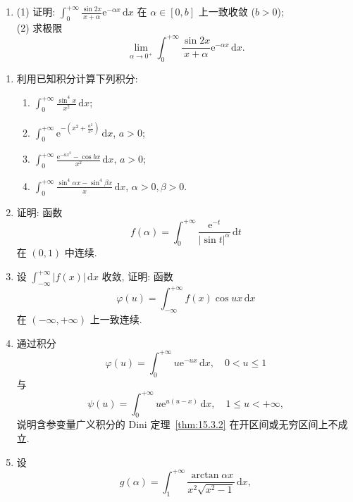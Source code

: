 \begin{exblock}[练习题 15.3]
\begin{enumerate}
\begin{enumerate}
    \item 在任何有限区间 $[0,A]$ 上 ($A>0$), 函数列 $\{f_{n}(x)\}$ 一致收敛于 $f(x)$.
  \end{enumerate}
  证明:
  \[
    \lim_{n\to+\infty}\int_{0}^{+\infty}f_{n}(x)\,\mathrm{d}x=\int_{0}^{+\infty}f(x)\,\mathrm{d}x.
\]
  \item (1) 证明: $\displaystyle\int_{0}^{+\infty}\frac{\sin2x}{x+\alpha}\mathrm{e}^{-\alpha x}\,\mathrm{d}x$ 在 $\alpha\in[0,b]$ 上一致收敛 ($b>0$);\\
  (2) 求极限
  \[
    \lim_{\alpha\to0^{+}}\int_{0}^{+\infty}\frac{\sin2x}{x+\alpha}\mathrm{e}^{-\alpha x}\,\mathrm{d}x.
\]
\end{enumerate}
\end{exblock}

\begin{exblock}[思考题 15.3]
\begin{enumerate}
  \item 利用已知积分计算下列积分:
  \begin{enumerate}
    \item $\displaystyle\int_{0}^{+\infty}\frac{\sin^{4}x}{x^{2}}\,\mathrm{d}x$;
    \item $\displaystyle\int_{0}^{+\infty}\mathrm{e}^{-\left(x^{2}+\frac{a^{2}}{x^{2}}\right)}\,\mathrm{d}x$, $a>0$;
    \item $\displaystyle\int_{0}^{+\infty}\frac{\mathrm{e}^{-ax^{2}}-\cos bx}{x^{2}}\,\mathrm{d}x$, $a>0$;
    \item $\displaystyle\int_{0}^{+\infty}\frac{\sin^{4}\alpha x-\sin^{4}\beta x}{x}\,\mathrm{d}x$, $\alpha>0,\beta>0$.
  \end{enumerate}
  \item 证明: 函数
  \[
    f(\alpha)=\int_{0}^{+\infty}\frac{\mathrm{e}^{-t}}{|\sin t|^{\alpha}}\,\mathrm{d}t
\]
  在 $(0,1)$ 中连续.
  \item 设 $\displaystyle\int_{-\infty}^{+\infty}|f(x)|\,\mathrm{d}x$ 收敛, 证明: 函数
  \[
    \varphi(u)=\int_{-\infty}^{+\infty}f(x)\cos ux\,\mathrm{d}x
\]
  在 $(-\infty,+\infty)$ 上一致连续.
  \item 通过积分
  \[
    \varphi(u)=\int_{0}^{+\infty}u\mathrm{e}^{-ux}\,\mathrm{d}x,\quad0<u\leqslant1
\]
  与
  \[
    \psi(u)=\int_{0}^{+\infty}u\mathrm{e}^{u(u-x)}\,\mathrm{d}x,\quad1\leqslant u<+\infty,
\]
  说明含参变量广义积分的 Dini 定理~\ref{thm:15.3.2} 在开区间或无穷区间上不成立.
  \item 设
  \[
    g(\alpha)=\int_{1}^{+\infty}\frac{\arctan\alpha x}{x^{2}\sqrt{x^{2}-1}}\,\mathrm{d}x,
\]

\end{enumerate}
\end{exblock}
